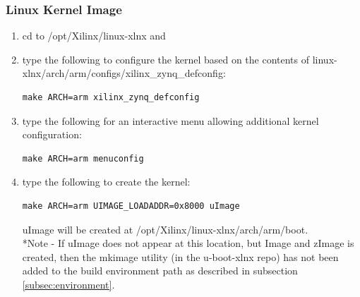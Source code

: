 \documentclass[12pt]{article}
\begin{document}
\subsubsection{Linux Kernel Image} \label{subsec:LinuxKernel}
\begin{enumerate}
\item cd to /opt/Xilinx/linux-xlnx and 
\item type the following to configure the kernel based on the contents of linux-xlnx/arch/arm/configs/xilinx\_zynq\_defconfig:
\begin{lstlisting}
make ARCH=arm xilinx_zynq_defconfig
\end{lstlisting}
\item type the following for an interactive menu allowing additional kernel configuration: 
\begin{lstlisting}
make ARCH=arm menuconfig
\end{lstlisting}
\item type the following to create the kernel: \label{itm:CreateKernel}
\begin{lstlisting}
make ARCH=arm UIMAGE_LOADADDR=0x8000 uImage
\end{lstlisting}
uImage will be created at /opt/Xilinx/linux-xlnx/arch/arm/boot.\\
*Note - If uImage does not appear at this location, but Image and zImage is created, then the mkimage utility (in the u-boot-xlnx repo) has not been added to the build environment path as described in subsection \ref{subsec:environment}.
\end{enumerate}
\end{document}
